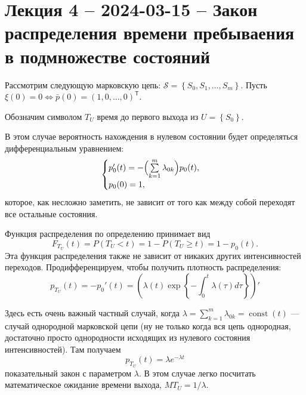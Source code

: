 \section{Лекция 4 -- 2024-03-15 -- Закон распределения времени пребываения в
подмножестве состояний}

\begin{ex}
  Рассмотрим следующую марковскую цепь:
  $\mathcal{S} = \left\{ S_0, S_1, \dots, S_m \right\} $. Пусть
  $\xi(0) = 0 \Leftrightarrow \bar{p}(0) = (1, 0, \dots, 0)^{\mathsf T}$.

  Обозначим символом $T_U$ время до первого выхода из $U = \left\{ S_0 \right\} $.
  \begin{figure}[h!]
    \centering
\end{figure}

  В этом случае вероятность нахождения в нулевом состоянии будет определяться
  дифференциальным уравнением:
  \[
    \begin{cases}
      p_0'(t) = - \Bigl( \sum\limits_{k=1}^m \lambda_{0k} \Bigr) p_0(t), \\
      p_0(0) = 1,
    \end{cases}
  \]
  которое, как несложно заметить, не зависит от того как между собой переходят 
  все остальные состояния.

  Функция распределения по определению принимает вид
  \[
    F_{T_U} (t) = P(T_U < t) = 1 - P(T_U \geqslant t) = 1- p_0(t).
  \]
  Эта функция распределения также не зависит от никаких других 
  интенсивностей переходов. Продифференцируем, чтобы получить плотность распределения:
  \[
    p_{T_U}(t) = - p_0'(t) = \left( \lambda(t) \exp\left\{ - \int_0^t \lambda(\tau)
    d\tau \right\} \right)'
  \]

  Здесь есть очень важный частный случай, когда $\lambda = \sum\limits_{k=1}^m
  \lambda_{0k} = \operatorname{const}(t)$ --- случай однородной марковской цепи
  (ну не только когда вся цепь однородная, достаточно просто однородности
  исходящих из нулевого состояния интенсивностей). Там получаем
  \[
    p_{T_U}(t) = \lambda e^{-\lambda t}
  \]
   показательный закон с параметром $\lambda$. В этом случае легко посчитать
  математическое ожидание времени выхода, $MT_U = 1/\lambda$.
\end{ex}

